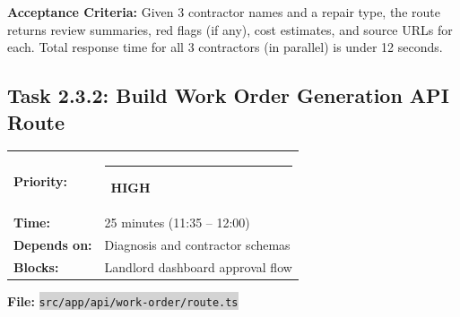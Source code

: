 \documentclass[11pt, a4paper]{article}
\newcommand{\highpri}{\textcolor{highamber}{\rule{6pt}{6pt}}~\textcolor{highamber}{\scriptsize\textbf{HIGH}}}
\newcommand{\code}[1]{\texttt{\small\colorbox{lightgray}{#1}}}
\begin{document}
\textbf{Acceptance Criteria:} Given 3 contractor names and a repair type, the route returns review summaries, red flags (if any), cost estimates, and source URLs for each. Total response time for all 3 contractors (in parallel) is under 12 seconds.

\vspace{1em}

\subsection{Task 2.3.2: Build Work Order Generation API Route}

\begin{tabularx}{\textwidth}{lX}
\textbf{Priority:} & \highpri \\
\textbf{Time:} & 25 minutes (11:35 -- 12:00) \\
\textbf{Depends on:} & Diagnosis and contractor schemas \\
\textbf{Blocks:} & Landlord dashboard approval flow \\
\end{tabularx}

\vspace{0.3em}

\textbf{File:} \code{src/app/api/work-order/route.ts}
\end{document}
